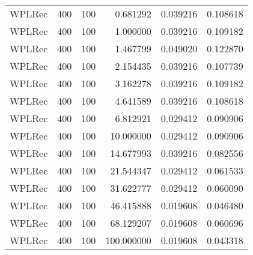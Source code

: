 \begin{tabular}{lllrrr}
 WPLRec &  400 &    100 &    0.681292 &     0.039216 &  0.108618 \\
 WPLRec &  400 &    100 &    1.000000 &     0.039216 &  0.109182 \\
 WPLRec &  400 &    100 &    1.467799 &     0.049020 &  0.122870 \\
 WPLRec &  400 &    100 &    2.154435 &     0.039216 &  0.107739 \\
 WPLRec &  400 &    100 &    3.162278 &     0.039216 &  0.109182 \\
 WPLRec &  400 &    100 &    4.641589 &     0.039216 &  0.108618 \\
 WPLRec &  400 &    100 &    6.812921 &     0.029412 &  0.090906 \\
 WPLRec &  400 &    100 &   10.000000 &     0.029412 &  0.090906 \\
 WPLRec &  400 &    100 &   14.677993 &     0.039216 &  0.082556 \\
 WPLRec &  400 &    100 &   21.544347 &     0.029412 &  0.061533 \\
 WPLRec &  400 &    100 &   31.622777 &     0.029412 &  0.060090 \\
 WPLRec &  400 &    100 &   46.415888 &     0.019608 &  0.046480 \\
 WPLRec &  400 &    100 &   68.129207 &     0.019608 &  0.060696 \\
 WPLRec &  400 &    100 &  100.000000 &     0.019608 &  0.043318 \\
\bottomrule
\end{tabular}
